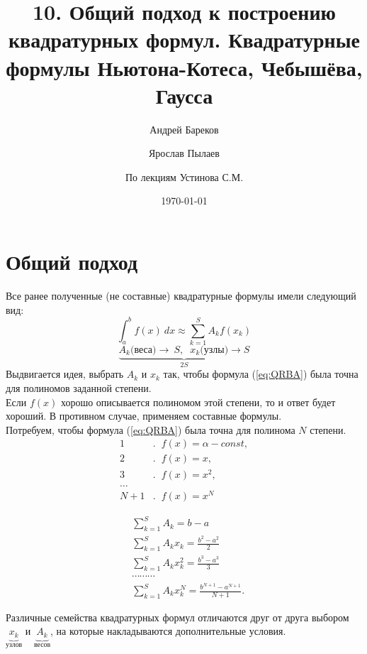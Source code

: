 \documentclass[a4paper,11pt]{article}
\title{10. Общий подход к построению квадратурных формул. Квадратурные формулы Ньютона-Котеса, Чебышёва, Гаусса}
\author{Андрей Бареков \and Ярослав Пылаев \and По лекциям Устинова С.М.}
\date{\today}
\begin{document}
\maketitle
\newpage

\section{Общий подход}
Все ранее полученные (не составные) квадратурные формулы имели следующий вид:
\begin{equation}
  \int_a^b f(x)\ dx \approx \sum_{k=1}^S A_k f(x_k)
  \label{eq:QRBA}
\end{equation}
\begin{equation*}
  \underbrace{A_k \text{(веса)} \rightarrow\ S, \hspace{7pt} x_k \text{(узлы)}\rightarrow S}_{2S}
\end{equation*}
Выдвигается идея, выбрать $A_k$ и $x_k$ так, чтобы формула (\ref{eq:QRBA}) была точна для полиномов заданной степени. \\
Если $f(x)$ хорошо описывается полиномом этой степени, то и ответ будет хороший. В противном случае, применяем составные формулы. \\

Потребуем, чтобы формула (\ref{eq:QRBA}) была точна для полинома $N$ степени.
\begin{align*}
  1&. \hspace{7pt}f(x) = \alpha - const, \\
  2&. \hspace{7pt}f(x) = x, \\
  3&. \hspace{7pt}f(x) = x^2, \\
  \dots \\
  N+1&. \hspace{7pt}f(x) = x^N
\end{align*}
\begin{importantblock}
  \begin{equation}
    \begin{split}
      &\sum_{k=1}^S A_k = b - a \\
      &\sum_{k=1}^S A_k x_k = \frac{b^2-a^2}{2} \\
      &\sum_{k=1}^S A_k x_k^2 = \frac{b^3-a^3}{3} \\
      &\cdots \cdots \cdots \\
      &\sum_{k=1}^S A_k x_k^N = \frac{b^{N+1}-a^{N+1}}{N+1}.
    \end{split}
    \label{eq:QRSys}
  \end{equation}
\end{importantblock}
Различные семейства квадратурных формул отличаются друг от друга выбором $\underbrace{x_k}_{\text{узлов}}$ и $\underbrace{A_k}_{\text{весов}}$, на которые
  накладываются дополнительные условия.
\end{document}
